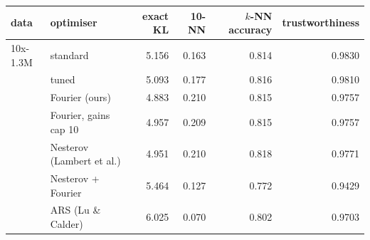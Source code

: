 \begin{tabular}{llrrrr}\toprule
data & optimiser & exact KL & 10-NN & $k$-NN accuracy & trustworthiness\\\midrule
10x-1.3M & standard & 5.156 & 0.163 & 0.814 & 0.9830\\
 & tuned & 5.093 & 0.177 & 0.816 & 0.9810\\
 & Fourier (ours) & 4.883 & 0.210 & 0.815 & 0.9757\\
 & Fourier, gains cap 10 & 4.957 & 0.209 & 0.815 & 0.9757\\
 & Nesterov (Lambert et al.) & 4.951 & 0.210 & 0.818 & 0.9771\\
 & Nesterov + Fourier & 5.464 & 0.127 & 0.772 & 0.9429\\
 & ARS (Lu \& Calder) & 6.025 & 0.070 & 0.802 & 0.9703\\
\bottomrule\end{tabular}
